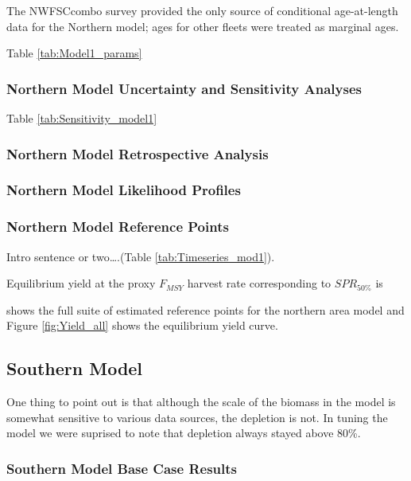 \documentclass[12pt,]{article}
\begin{document}
The NWFSCcombo survey provided the only source of conditional
age-at-length data for the Northern model; ages for other fleets were
treated as marginal ages.

Table \ref{tab:Model1_params}

\subsubsection{Northern Model Uncertainty and Sensitivity
Analyses}\label{northern-model-uncertainty-and-sensitivity-analyses}

Table \ref{tab:Sensitivity_model1}

\subsubsection{Northern Model Retrospective
Analysis}\label{northern-model-retrospective-analysis}

\subsubsection{Northern Model Likelihood
Profiles}\label{northern-model-likelihood-profiles}

\subsubsection{Northern Model Reference
Points}\label{northern-model-reference-points}

Intro sentence or two\ldots{}.(Table \ref{tab:Timeseries_mod1}).

Equilibrium yield at the proxy \(F_{MSY}\) harvest rate corresponding to
\(SPR_{50\%}\) is

shows the full suite of estimated reference points for the northern area
model and Figure \ref{fig:Yield_all} shows the equilibrium yield curve.

\clearpage

\subsection{Southern Model}\label{southern-model}

One thing to point out is that although the scale of the biomass in the
model is somewhat sensitive to various data sources, the depletion is
not. In tuning the model we were suprised to note that depletion always
stayed above 80\%.

\subsubsection{Southern Model Base Case
Results}\label{southern-model-base-case-results}
\end{document}
